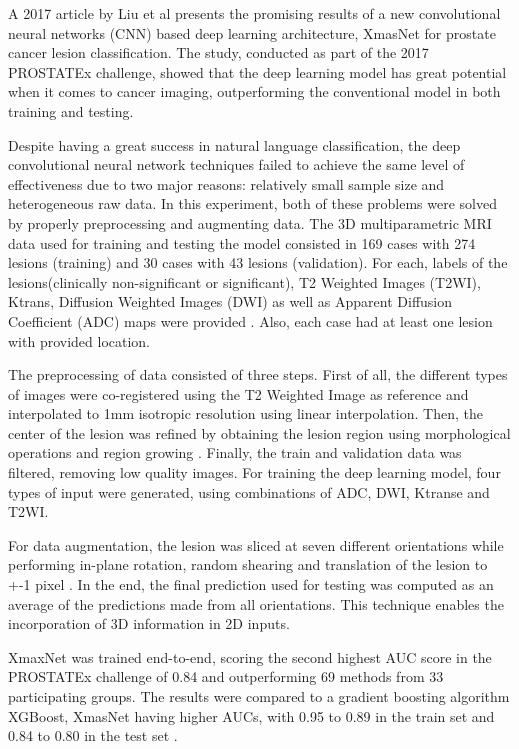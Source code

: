 \documentclass[runningheads,a4paper,11pt]{report}
\begin{document}
A 2017 article by Liu et al \cite{liu2017prostate} presents the promising results of a new convolutional neural networks (CNN) based deep learning architecture, XmasNet for prostate cancer lesion classification. The study, conducted as part of the 2017 PROSTATEx challenge, showed that the deep learning model has great potential when it comes to cancer imaging, outperforming the conventional model in both training and testing. 

Despite having a great success in natural language classification, the deep convolutional neural network techniques failed to achieve the same level of effectiveness due to two major reasons: relatively small sample size and heterogeneous raw data. In this experiment, both of these problems were solved by properly preprocessing and augmenting data. The 3D multiparametric MRI data used for training and testing the model consisted in 169 cases with 274 lesions (training) and 30 cases with 43 lesions (validation). For each, labels of the lesions(clinically non-significant or significant), T2 Weighted Images (T2WI), Ktrans, Diffusion Weighted Images (DWI) as well as Apparent Diffusion Coefficient (ADC) maps were provided \cite{liu2017prostate}. Also, each case had at least one lesion with provided location. 

The preprocessing of  data consisted of three steps. First of all, the different types of images were co-registered using the T2 Weighted Image as reference and interpolated to 1mm isotropic resolution using linear interpolation. Then, the center of the lesion was refined by obtaining the lesion region using morphological operations and region growing \cite{liu2017prostate}. Finally, the train and validation data was filtered, removing low quality images. For training the deep learning model, four types of input were generated, using combinations of ADC, DWI, Ktranse and T2WI.

For data augmentation, the lesion was sliced at seven different orientations while performing in-plane rotation, random shearing and translation of the lesion to +-1 pixel \cite{liu2017prostate}. In the end, the final prediction used for testing was computed as an average of the predictions made from all orientations. This technique enables the incorporation of 3D information in 2D inputs. 

XmaxNet was trained end-to-end,  scoring the second highest AUC score in the PROSTATEx challenge of 0.84 and outperforming 69 methods from 33 participating groups.
The results were compared to a gradient boosting algorithm XGBoost, XmasNet having higher AUCs, with 0.95 to 0.89 in the train set and 0.84 to 0.80 in the test set \cite{liu2017prostate}. 
\end{document}
